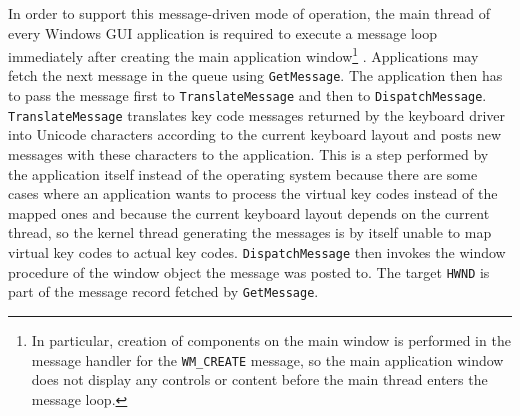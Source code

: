			In order to support this message-driven mode of operation, the main
			thread of every Windows GUI application is required to execute a
			message loop immediately after creating the main application
			window\footnote{In particular, creation of components on the main
			window is performed in the message handler for the
			\texttt{WM\_CREATE} message, so the main application window does
			not display any controls or content before the main thread enters
			the message loop.} \cite{messages}. Applications may fetch the next message in the
			queue using \texttt{GetMessage}. The application then has to pass
			the message first to \texttt{TranslateMessage} and then to
			\texttt{DispatchMessage}. \texttt{TranslateMessage} translates key
			code messages returned by the keyboard driver into Unicode
			characters according to the current keyboard layout and posts new
			messages with these characters to the application. This is a step performed
			by the application itself instead of the operating system because
			there are some cases where an application wants to process the virtual
			key codes instead of the mapped ones \cite{translatemessage} and because the current keyboard
			layout depends on the current thread, so the kernel thread generating
			the messages is by itself unable to map virtual key codes to actual
			key codes. \texttt{DispatchMessage} then invokes the window procedure
			of the window object the message was posted to. The target \texttt{HWND}
			is part of the message record fetched by \texttt{GetMessage}. \cite{messages}


